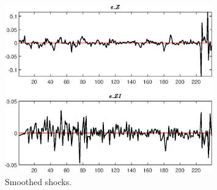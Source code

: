  
\begin{figure}[H]
\centering 
\includegraphics[width=0.80\textwidth]{two_sector_RBC_differentiated_est/graphs/two_sector_RBC_differentiated_est_SmoothedShocks1}
\caption{Smoothed shocks.}\label{Fig:SmoothedShocks:1}
\end{figure}


